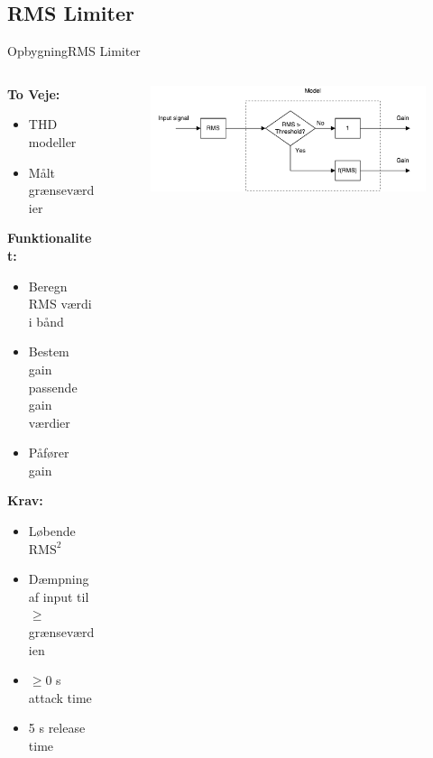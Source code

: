 

\subsection{RMS Limiter}
\begin{frame}{Opbygning}{RMS Limiter}
\begin{columns}
  \begin{column}{0.4\textwidth}
\textbf{To Veje:}
\begin{itemize}
	\item THD modeller
	\item Målt grænseværdier
\end{itemize}
  \textbf{Funktionalitet:}
\begin{itemize}
\item Beregn RMS værdi i bånd
\item Bestem gain passende gain værdier
\item Påfører gain
\end{itemize}
\textbf{Krav:}
\begin{itemize}
\item Løbende $\text{RMS}^2$
\item Dæmpning af input til $\geq$ grænseværdien
\item $\geq$0 s attack time
\item 5 s release time
\end{itemize}
  \end{column}

  \begin{column}{0.6\textwidth}
\begin{figure}
\centering
\includegraphics[width=\textwidth]{designRealRMS}
\end{figure}


  \end{column}
\end{columns}
\end{frame}



